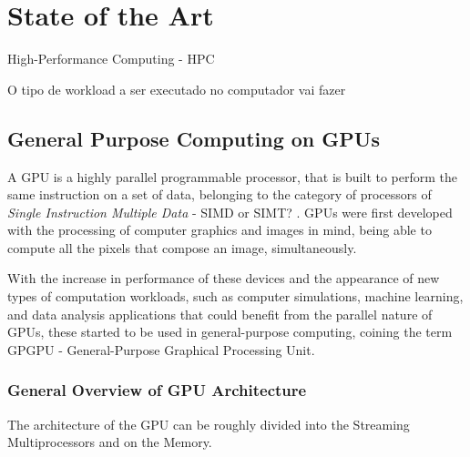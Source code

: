 
\chapter{State of the Art}
\label{chapter:stateoftheart}




High-Performance Computing - HPC

O tipo de workload a ser executado no computador vai fazer 


\section{General Purpose Computing on GPUs}
\label{section:gpuarch}

A GPU is a highly parallel programmable processor, that is built to perform the same instruction on a set of data, belonging to the category of processors of \textit{Single Instruction Multiple Data} - SIMD or SIMT? . GPUs were first developed with the processing of computer graphics and images in mind, being able to compute all the pixels that compose an image, simultaneously. 

With the increase in performance of these devices and the appearance of new types of computation workloads, such as computer simulations, machine learning, and data analysis applications that could benefit from the parallel nature of GPUs, these started to be used in general-purpose computing, coining the term GPGPU - General-Purpose Graphical Processing Unit.

\subsection{General Overview of GPU Architecture}

The architecture of the GPU can be roughly divided into the Streaming Multiprocessors and on the Memory.  
